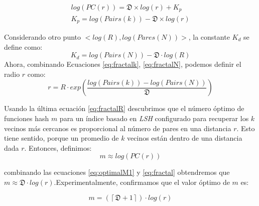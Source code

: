 
\begin{eqnarray}\label{eq:fractalk}
	   log(PC(r)) = \mathfrak{D} \times log (r) + K_p \nonumber\\
	   K_p   = log (Pairs (k)) - \mathfrak{D} \times log (r)
\end{eqnarray} 
	
Considerando otro punto $ <log(R), log(Pares(N))> $, la constante $ K_d $ se define como:
\begin{equation}\label{eq:fractalN}
    K_d    = log (Pairs(N)) - \mathfrak{D} \cdot log (R) 
\end{equation} 
Ahora, combinando Ecuaciones \ref{eq:fractalk}, \ref{eq:fractalN}, podemos definir el radio $r$ como:
\begin{equation}\label{eq:fractalR}
  r  =  R \cdot  exp (  \frac{log (Pairs (k)) - log (Pairs(N))}{ \mathfrak{D} } )    
\end{equation}
 
Usando la última ecuación \ref{eq:fractalR} descubrimos que el número óptimo de funciones hash $m$ para un índice basado en \textit{LSH} configurado para recuperar los $k$ vecinos más cercanos es proporcional al número de pares en una distancia $r$. Esto tiene sentido, porque un promedio de $k$ vecinos están dentro de una distancia dada $r$. Entonces, definimos:
\begin{equation}\label{eq:optimalM1}
   m \approx log (PC(r)) 
\end{equation}

combinando las ecuaciones \ref{eq:optimalM1} y \ref{eq:fractal} obtendremos que $m \approx \mathfrak{D} \cdot log (r)  $.Experimentalmente, confirmamos que el valor óptimo de $m$ es:

 \begin{equation}\label{eq:fractalm}
    m = (\left\lceil \mathfrak{D} + 1 \right\rceil  ) \cdot  log (r)
 \end{equation}

